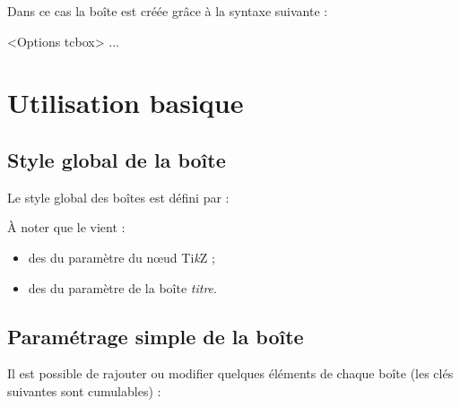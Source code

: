 \documentclass[french,11pt,a4paper]{article}
\begin{document}
Dans ce cas la boîte est créée grâce à la syntaxe suivante :

\begin{codehigh}[language=latex/latex2,style/main=cyan!10,style/code=cyan!10]
\begin{NomEnv}[Clés]<Options tcbox>
...
\end{NomEnv}
\end{codehigh}

\pagebreak

\section{Utilisation basique}

\subsection{Style global de la boîte}

Le style global des boîtes est défini par :

\begin{codehigh}[language=latex/latex2,style/main=cyan!10,style/code=cyan!10]
\end{codehigh}

À noter que le  vient :

\begin{itemize}
	\item des  du paramètre  du nœud Ti\textit{k}Z ;
	\item des  du paramètre  de la boîte \textit{titre}.
\end{itemize}

\subsection{Paramétrage simple de la boîte}

Il est possible de rajouter ou modifier quelques éléments de chaque boîte (les clés suivantes sont cumulables) :
\end{document}
